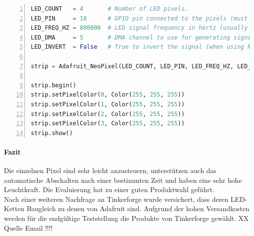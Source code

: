 \begin{itemize}
\begin{lstlisting}[caption = Testcode zur Ansteuerung der LEDs, language=python, frame=single, breaklines=true,columns=fullflexible, commentstyle=\color{gray}\upshape, captionpos=b, numbers = left]
LED_COUNT   = 4       # Number of LED pixels. 
LED_PIN     = 18      # GPIO pin connected to the pixels (must support PWM!).
LED_FREQ_HZ = 800000  # LED signal frequency in hertz (usually 800khz)
LED_DMA     = 5       # DMA channel to use for generating signal (try 5)
LED_INVERT  = False   # True to invert the signal (when using NPN)

strip = Adafruit_NeoPixel(LED_COUNT, LED_PIN, LED_FREQ_HZ, LED_DMA, LED_INVERT)

strip.begin()
strip.setPixelColor(0, Color(255, 255, 255))
strip.setPixelColor(1, Color(255, 255, 255))
strip.setPixelColor(2, Color(255, 255, 255))
strip.setPixelColor(3, Color(255, 255, 255))
strip.show()
\end{lstlisting}
\end{itemize}
\paragraph{Fazit}
Die einzelnen Pixel sind sehr leicht anzusteuern, unterstützen auch das automatische Abschalten nach einer bestimmten Zeit und haben eine sehr hohe Leuchtkraft. Die Evaluierung hat zu einer guten Produktwahl geführt. \\ 
Nach einer weiteren Nachfrage an Tinkerforge wurde versichert, dass deren LED-Ketten Baugleich zu denen von Adafruit sind. Aufgrund der hohen Versandkosten werden für die endgültige Teststellung die Produkte von Tinkerforge gewählt. XX Quelle Email !!!!
